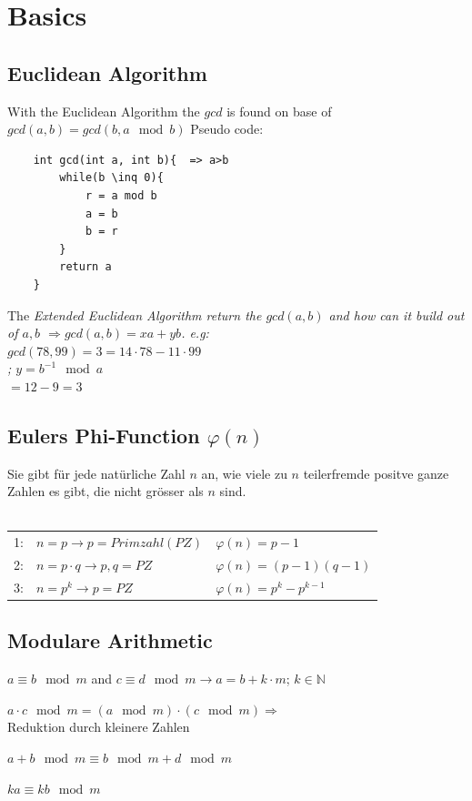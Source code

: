 \section{Basics}
\begin{minipage}{9cm}
\subsection{Euclidean Algorithm}
With the Euclidean Algorithm the $gcd$ is found on base of $gcd(a,b)=gcd(b,a \mod b)$ 
Pseudo code:
\begin{verbatim}
	int gcd(int a, int b){	=> a>b
		while(b \inq 0){
			r = a mod b
			a = b
			b = r
		}
		return a
	}
\end{verbatim}
The \em Extended Euclidean Algorithm \em return the $gcd(a,b)$ 
and how can it build out of $a,b$ $\Rightarrow gcd(a,b)=x a + y b$. 
e.g:\\ 
$gcd(78,99)=3=14 \cdot 78 - 11 \cdot 99$\\
\negmedspace; $y=b^{-1} \mod a$\\
$=12-9=3$\\
\end{minipage}
\hspace{4mm}
\begin{minipage}{9.5cm}
\subsection{Eulers Phi-Function $\varphi(n)$}
Sie gibt f\"ur jede nat\"urliche Zahl $n$ an, wie viele zu $n$ teilerfremde positve 
ganze Zahlen es gibt, die nicht gr\"osser als $n$ sind.\\
\\ 

\begin{tabular}{| l l l |}
	\hline
	1:		&	$n=p \to p=Primzahl(PZ)$				&	$\varphi(n)=p-1$\\
	2:		&	$n=p \cdot q \to p,q=PZ$	&	$\varphi(n)=(p-1)(q-1)$\\
	3:		&	$n=p^k \to p=PZ$			&	$\varphi(n)=p^k-p^{k-1}$\\
	\hline
\end{tabular}

\subsection{Modulare Arithmetic}
$a \equiv b \mod m$ and $c \equiv d \mod m \to a=b+k \cdot m$; $k \in \mathbb{N}$ \\
\begin{liste}

\item $a \cdot c \mod m = (a \mod m) \cdot (c \mod m) \Rightarrow$ \\ Reduktion durch kleinere Zahlen
\item $a + b \mod m \equiv b \mod m + d \mod m$
\item $k a \equiv k b \mod m$
\end{liste}
\end{minipage}
